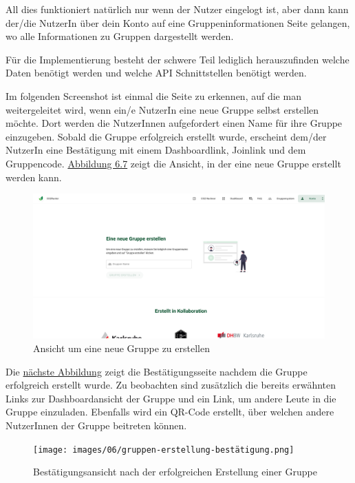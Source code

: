 All dies funktioniert natürlich nur wenn der Nutzer eingelogt ist, aber dann kann der/die NutzerIn über dein Konto auf eine Gruppeninformationen Seite gelangen, wo alle Informationen zu Gruppen dargestellt werden.

Für die Implementierung besteht der schwere Teil lediglich herauszufinden welche Daten benötigt werden und welche \acs{API} Schnittstellen benötigt werden.

Im folgenden Screenshot ist einmal die Seite zu erkennen, auf die man weitergeleitet wird, wenn ein/e NutzerIn eine neue Gruppe selbst erstellen möchte.
Dort werden die NutzerInnen aufgefordert einen Name für ihre Gruppe einzugeben.
Sobald die Gruppe erfolgreich erstellt wurde, erscheint dem/der NutzerIn eine Bestätigung mit einem Dashboardlink, Joinlink und dem Gruppencode.
\hyperref[fig:neue-gruppe-design]{Abbildung 6.7} zeigt die Ansicht, in der eine neue Gruppe erstellt werden kann.

\begin{figure}[H]
    \centering
    \includegraphics[width=1\textwidth]{images/06/gruppe-erstellen-design.png}
    \caption{Ansicht um eine neue Gruppe zu erstellen}
    \label{fig:neue-gruppe-design}
\end{figure}

Die \hyperref[fig:gruppe-erfolgreich-erstellt]{nächste Abbildung} zeigt die Bestätigungsseite nachdem die Gruppe erfolgreich erstellt wurde.
Zu beobachten sind zusätzlich die bereits erwähnten Links zur Dashboardansicht der Gruppe und ein Link, um andere Leute in die Gruppe einzuladen.
Ebenfalls wird ein QR-Code erstellt, über welchen andere NutzerInnen der Gruppe beitreten können.

\begin{figure}[H]
    \centering
    \texttt{[image: images/06/gruppen-erstellung-bestätigung.png]}
    \caption{Bestätigungsansicht nach der erfolgreichen Erstellung einer Gruppe}
    \label{fig:gruppe-erfolgreich-erstellt}
\end{figure}

